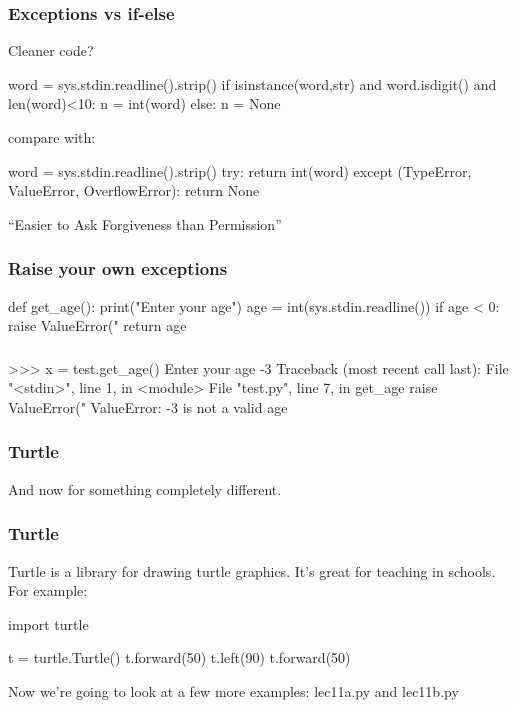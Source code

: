 \documentclass{beamer}
\begin{document}
\begin{frame}[fragile]
\frametitle{Exceptions vs if-else}
Cleaner code?
\begin{code}
word = sys.stdin.readline().strip()
if isinstance(word,str)  and word.isdigit() and len(word)<10:
   n = int(word)
else:
   n = None
\end{code}

\bigskip

compare with:

\begin{code}
word = sys.stdin.readline().strip()
try:
    return int(word)
except (TypeError, ValueError, OverflowError): 
    return None
\end{code}
``Easier to Ask Forgiveness than Permission'' 
\end{frame}

\begin{frame}[fragile]
\frametitle{Raise your own exceptions}
\begin{code}
def get_age():
   print("Enter your age") 
   age = int(sys.stdin.readline())
   if age < 0:
      raise ValueError("%
   return age
\end{code}
\end{frame}


\begin{frame}[fragile]
\frametitle{}
\begin{code}
>>> x = test.get_age()
Enter your age
-3
Traceback (most recent call last):
  File "<stdin>", line 1, in <module>
  File "test.py", line 7, in get_age
    raise ValueError("%
ValueError: -3 is not a valid age
\end{code}
\end{frame}


\begin{frame}[fragile]
\frametitle{Turtle}
And now for something completely different.
\end{frame}


\begin{frame}[fragile]
\frametitle{Turtle}
Turtle is a library for drawing turtle graphics. It's great for
teaching in schools. For example:

\begin{code}
import turtle

t = turtle.Turtle()
t.forward(50)
t.left(90)
t.forward(50)
\end{code}

\bigskip

Now we're going to look at a few more examples: lec11a.py and
lec11b.py
\end{frame}
\end{document}
